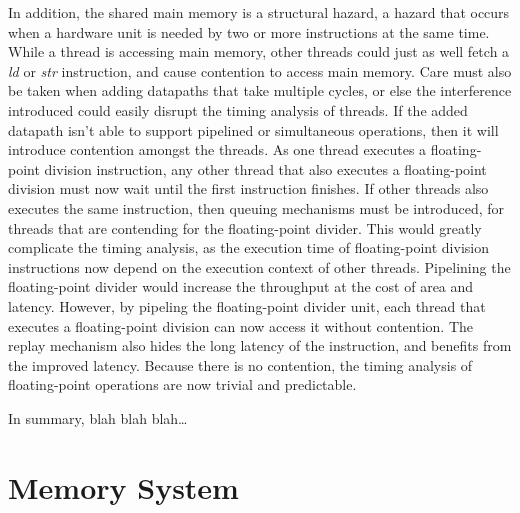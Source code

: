 In addition, the shared main memory is a structural hazard, a hazard that occurs when a hardware unit is needed by two or more instructions at the same time.
While a thread is accessing main memory, other threads could just as well fetch a \emph{ld} or \emph{str} instruction, and cause contention to access main memory.
Care must also be taken when adding datapaths that take multiple cycles, or else the interference introduced could easily disrupt the timing analysis of threads.
If the added datapath isn't able to support pipelined or simultaneous operations, then it will introduce contention amongst the threads.
As one thread executes a floating-point division instruction, any other thread that also executes a floating-point division must now wait until the first instruction finishes. 
If other threads also executes the same instruction, then queuing mechanisms must be introduced, for threads that are contending for the floating-point divider. 
This would greatly complicate the timing analysis, as the execution time of floating-point division instructions now depend on the execution context of other threads.
Pipelining the floating-point divider would increase the throughput at the cost of area and latency. 
However, by pipeling the floating-point divider unit, each thread that executes a floating-point division can now access it without contention. 
The replay mechanism also hides the long latency of the instruction, and benefits from the improved latency. 
Because there is no contention, the timing analysis of floating-point operations are now trivial and predictable. 

In summary, blah blah blah\ldots
\section{Memory System}
\label{section:memory_system}


